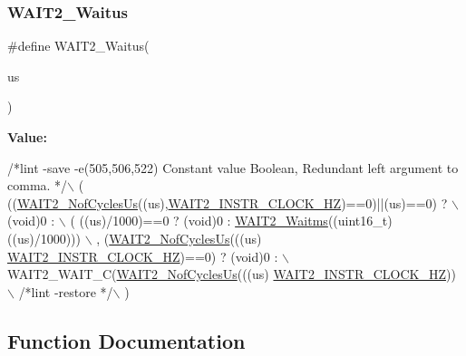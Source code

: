 \mbox{\label{group___w_a_i_t2__module_ga42b1b78d02425ac522fcacd744e66d91}} 
\subsubsection{\texorpdfstring{W\+A\+I\+T2\+\_\+\+Waitus}{WAIT2\_Waitus}}
{\footnotesize\ttfamily \#define W\+A\+I\+T2\+\_\+\+Waitus(\begin{DoxyParamCaption}\item[{}]{us }\end{DoxyParamCaption})}

{\bfseries Value\+:}
\begin{DoxyCode}
\textcolor{comment}{/*lint -save -e(505,506,522) Constant value Boolean, Redundant left argument to comma. */}\(\backslash\)
       (  ((\hyperlink{group___w_a_i_t2__module_gaea93c12588315526fa7ebe7c305ea8f0}{WAIT2\_NofCyclesUs}((us),\hyperlink{group___w_a_i_t2__module_ga42be87062ba4bee82e74182008e6afbc}{WAIT2\_INSTR\_CLOCK\_HZ})==0)||(us)==0)
       ? \(\backslash\)
          (\textcolor{keywordtype}{void})0 : \(\backslash\)
          ( ((us)/1000)==0 ? (void)0 : \hyperlink{group___w_a_i_t2__module_ga0ca6d6b6223491aaa5fca0ef97ecee27}{WAIT2\_Waitms}((uint16\_t)((us)/1000))) \(\backslash\)
          , (\hyperlink{group___w_a_i_t2__module_gaea93c12588315526fa7ebe7c305ea8f0}{WAIT2\_NofCyclesUs}(((us)%
      \hyperlink{group___w_a_i_t2__module_ga42be87062ba4bee82e74182008e6afbc}{WAIT2\_INSTR\_CLOCK\_HZ})==0) ? (\textcolor{keywordtype}{void})0 : \(\backslash\)
            WAIT2\_WAIT\_C(\hyperlink{group___w_a_i_t2__module_gaea93c12588315526fa7ebe7c305ea8f0}{WAIT2\_NofCyclesUs}(((us)%
      \hyperlink{group___w_a_i_t2__module_ga42be87062ba4bee82e74182008e6afbc}{WAIT2\_INSTR\_CLOCK\_HZ})) \(\backslash\)
       \textcolor{comment}{/*lint -restore */}\(\backslash\)
       )
\end{DoxyCode}


\subsection{Function Documentation}
\mbox{\label{group___w_a_i_t2__module_ga0d401ca6ca297b5b7a450deed0c42b78}} 
